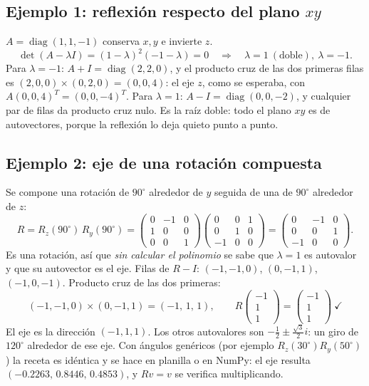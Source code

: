 \subsection{Ejemplo 1: reflexión respecto del plano \texorpdfstring{$xy$}{xy}}

\(A=\operatorname{diag}(1,1,-1)\) conserva \(x,y\) e invierte \(z\).
\[
  \det(A-\lambda I)=(1-\lambda)^2(-1-\lambda)=0
  \quad\Longrightarrow\quad\lambda=1\ (\text{doble}),\ \lambda=-1 .
\]
Para \(\lambda=-1\): \(A+I=\operatorname{diag}(2,2,0)\), y el producto cruz de las dos
primeras filas es \((2,0,0)\times(0,2,0)=(0,0,4)\): el eje \(z\), como se esperaba, con
\(A(0,0,4)^T=(0,0,-4)^T\). Para \(\lambda=1\): \(A-I=\operatorname{diag}(0,0,-2)\), y
cualquier par de filas da producto cruz nulo. Es la raíz doble: todo el plano \(xy\) es de
autovectores, porque la reflexión lo deja quieto punto a punto.

\subsection{Ejemplo 2: eje de una rotación compuesta}

Se compone una rotación de \(90^\circ\) alrededor de \(y\) seguida de una de \(90^\circ\)
alrededor de \(z\):
\[
  R=R_z(90^\circ)\,R_y(90^\circ)=
  \begin{pmatrix}0&-1&0\\1&0&0\\0&0&1\end{pmatrix}
  \begin{pmatrix}0&0&1\\0&1&0\\-1&0&0\end{pmatrix}
  =\begin{pmatrix}0&-1&0\\0&0&1\\-1&0&0\end{pmatrix}.
\]
Es una rotación, así que \emph{sin calcular el polinomio} se sabe que \(\lambda=1\) es
autovalor y que su autovector es el eje. Filas de \(R-I\): \((-1,-1,0)\), \((0,-1,1)\),
\((-1,0,-1)\). Producto cruz de las dos primeras:
\[
  (-1,-1,0)\times(0,-1,1)=(-1,\,1,\,1),
  \qquad
  R\begin{pmatrix}-1\\1\\1\end{pmatrix}=\begin{pmatrix}-1\\1\\1\end{pmatrix}\ \checkmark
\]
El eje es la dirección \((-1,1,1)\). Los otros autovalores son \(-\frac12\pm\frac{\sqrt3}2 i\):
un giro de \(120^\circ\) alrededor de ese eje. Con ángulos genéricos (por ejemplo
\(R_z(30^\circ)R_y(50^\circ)\)) la receta es idéntica y se hace en planilla o en NumPy: el
eje resulta \((-0.2263,\,0.8446,\,0.4853)\), y \(Rv=v\) se verifica multiplicando.


